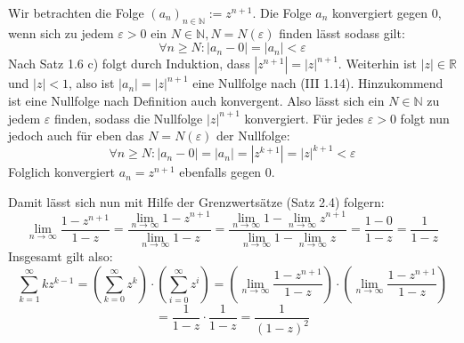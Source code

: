 \documentclass[a4paper,graphics,11pt]{article}
\begin{document}
Wir betrachten die Folge $(a_n)_{n\in \mathbb{N}} := z^{n+1}$.
Die Folge $a_n$ konvergiert gegen 0, wenn sich zu jedem $\varepsilon > 0$ ein 
$N \in \mathbb{N}, N = N(\varepsilon)$ finden lässt sodass gilt:
$$
    \forall n \geq N\colon |a_n - 0| = |a_n| < \varepsilon
$$
Nach Satz 1.6 c) folgt durch Induktion, dass $|z^{n+1}| = |z|^{n+1}$. Weiterhin ist $|z| \in \mathbb{R}$
und $|z| < 1$, also ist $|a_n| = |z|^{n+1}$ eine Nullfolge nach (III 1.14). Hinzukommend
ist eine Nullfolge nach Definition auch konvergent. Also lässt sich ein $N\in \mathbb{N}$ 
zu jedem $\varepsilon$ finden, sodass die Nullfolge $|z|^{n+1}$ konvergiert.
Für jedes $\varepsilon > 0$ folgt nun jedoch auch für eben das $N = N(\varepsilon)$ der
Nullfolge:
$$
    \forall n \geq N \colon |a_n - 0| = |a_n| = |z^{k+1}| = |z|^{k+1} < \varepsilon
$$
Folglich konvergiert $a_n = z^{n+1}$ ebenfalls gegen 0.

Damit lässt sich nun mit Hilfe der Grenzwertsätze (Satz 2.4) folgern:
$$
    \lim_{n \to \infty} \frac{1-z^{n+1}}{1-z}
    = \frac{\lim_{n \to \infty}\limits 1-z^{n+1}}{\lim_{n \to \infty}\limits 1-z}
    = \frac{\lim_{n \to \infty}\limits 1-\lim_{n \to \infty}\limits z^{n+1}}
        {\lim_{n \to \infty}\limits1- \lim_{n \to \infty}\limits z}
    =\frac{1-0}{1-z} = \frac{1}{1-z}
$$
Insgesamt gilt also:
$$
    \sum_{k=1}^{\infty} kz^{k-1}
    =\left(\sum_{k=0}^{\infty} z^k\right)\cdot\left(\sum_{i=0}^{\infty}z^i\right)
    = \left(\lim_{n \to \infty} \frac{1-z^{n+1}}{1-z}\right)\cdot\left(\lim_{n \to \infty} \frac{1-z^{n+1}}{1-z}\right)
$$$$
    = \frac{1}{1-z} \cdot \frac{1}{1-z} = \frac{1}{(1-z)^2}
$$
\end{document}
